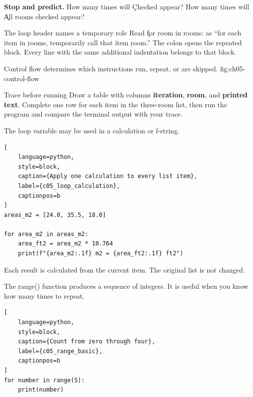 \begin{NoteBox}
\textbf{Stop and predict.} How many times will \c{Checked} appear? How many
times will \c{All rooms checked} appear?
\end{NoteBox}

\begin{SyntaxBox}{The loop header names a temporary role}
Read \c{for room in rooms:} as ``for each item in \c{rooms}, temporarily call
that item \c{room}.'' The colon opens the repeated block. Every line with the
same additional indentation belongs to that block.
\end{SyntaxBox}

{Control flow determines which instructions run, repeat, or are skipped.}
{fig:ch05-control-flow}

\begin{TryBox}{Trace before running}
Draw a table with columns \textbf{iteration}, \textbf{room}, and
\textbf{printed text}. Complete one row for each item in the three-room list,
then run the program and compare the terminal output with your trace.
\end{TryBox}


The loop variable may be used in a calculation or f-string.

\begin{lstlisting}[
    language=python,
    style=block,
    caption={Apply one calculation to every list item},
    label={c05_loop_calculation},
    captionpos=b
]
areas_m2 = [24.0, 35.5, 18.0]

for area_m2 in areas_m2:
    area_ft2 = area_m2 * 10.764
    print(f"{area_m2:.1f} m2 = {area_ft2:.1f} ft2")
\end{lstlisting}

Each result is calculated from the current item. The original list is not
changed.


The \c{range()} function produces a sequence of integers. It is useful when
you know how many times to repeat.

\begin{lstlisting}[
    language=python,
    style=block,
    caption={Count from zero through four},
    label={c05_range_basic},
    captionpos=b
]
for number in range(5):
    print(number)
\end{lstlisting}


